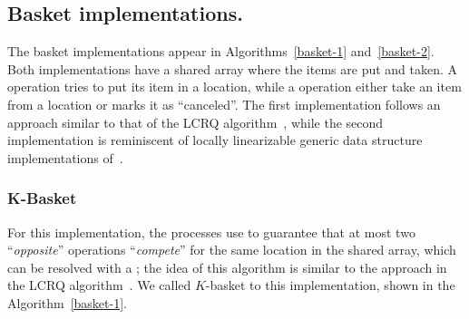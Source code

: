 


\subsection{\label{subsec:basket-implementation}Basket implementations.}
The basket implementations appear in Algorithms~\ref{basket-1} and~\ref{basket-2}. Both implementations have a shared array where the items are put and taken. A \Put{} operation tries to put its item in a location, while a \Take{} operation either take an item from a location or marks it as ``canceled''.  The first implementation follows an approach similar to that of the LCRQ algorithm~\cite{ppopp2013x86queues}, while the second implementation is reminiscent of locally linearizable generic data structure implementations of~\cite{DBLP_conf_concur_HaasHHKLPSSV16}.

\subsubsection{K-Basket}

For this implementation, the processes use \FAI{} to guarantee that at most two ``\textit{opposite}'' operations ``\textit{compete}'' for the same location in the shared array, which can be resolved with a \SWAP; the idea of this algorithm is similar to the approach in the LCRQ algorithm~\cite{ppopp2013x86queues}. We called \(K\)-basket to this implementation, shown in the Algorithm~\ref{basket-1}.



